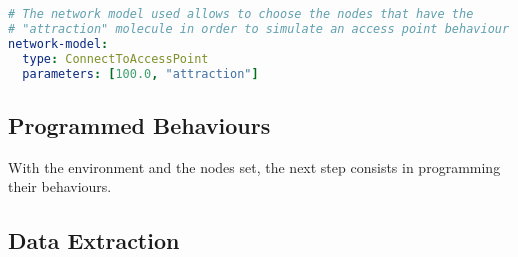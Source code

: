 \begin{lstlisting}[language=yaml, label=code:linking, caption=Defining the linking rule: only nodes with the molecule \texttt{attraction} will connect to other nodes within a radius of 100 meters.]
# The network model used allows to choose the nodes that have the
# "attraction" molecule in order to simulate an access point behaviour
network-model:
  type: ConnectToAccessPoint
  parameters: [100.0, "attraction"]
\end{lstlisting}

\subsection{Programmed Behaviours}
With the environment and the nodes set, the next step consists in programming their behaviours.

\subsection{Data Extraction}